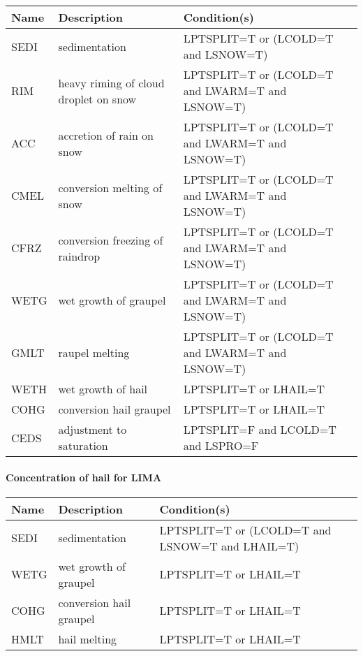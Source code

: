 \begin{longtable} {|p{}|p{}|p{}|}
\hline
Name & Description & Condition(s) \\
\hline \hline
\endhead
SEDI   & sedimentation                                  & LPTSPLIT=T or (LCOLD=T and LSNOW=T) \\\hline
RIM    & heavy riming of cloud droplet on snow          & LPTSPLIT=T or (LCOLD=T and LWARM=T and LSNOW=T) \\\hline
ACC    & accretion of rain on snow                      & LPTSPLIT=T or (LCOLD=T and LWARM=T and LSNOW=T) \\\hline
CMEL   & conversion melting of snow                     & LPTSPLIT=T or (LCOLD=T and LWARM=T and LSNOW=T) \\\hline
CFRZ   & conversion freezing of raindrop                & LPTSPLIT=T or (LCOLD=T and LWARM=T and LSNOW=T) \\\hline
WETG   & wet growth of graupel                          & LPTSPLIT=T or (LCOLD=T and LWARM=T and LSNOW=T) \\\hline
GMLT   & raupel melting                                 & LPTSPLIT=T or (LCOLD=T and LWARM=T and LSNOW=T) \\\hline
WETH   & wet growth of hail                             & LPTSPLIT=T or LHAIL=T \\\hline
COHG   & conversion hail graupel                        & LPTSPLIT=T or LHAIL=T \\\hline
CEDS   & adjustment to saturation                       & LPTSPLIT=F and LCOLD=T and LSPRO=F \\\hline
\end{longtable}

\paragraph{Concentration of hail for LIMA}
\mbox{} %

\begin{longtable} {|p{}|p{}|p{}|}
\hline
Name & Description & Condition(s) \\
\hline \hline
\endhead
SEDI   & sedimentation                                  & LPTSPLIT=T or (LCOLD=T and LSNOW=T and LHAIL=T) \\\hline
WETG   & wet growth of graupel                          & LPTSPLIT=T or LHAIL=T \\\hline
COHG   & conversion hail graupel                        & LPTSPLIT=T or LHAIL=T \\\hline
HMLT   & hail melting                                   & LPTSPLIT=T or LHAIL=T \\\hline
\end{longtable}

